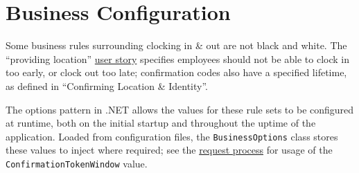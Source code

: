 \section{Business Configuration}

Some business rules surrounding clocking in \& out are not
black and white. The \enquote{providing location}
\hyperref[ss:stories]{user story} specifies employees should
not be able to clock in too early, or clock out too late;
confirmation codes also have a specified lifetime, as
defined in \enquote{Confirming Location \& Identity}. 

The options pattern in .NET allows the values for these rule
sets to be configured at runtime, both on the initial
startup and throughout the uptime of the application. Loaded
from configuration files, the \lstinline{BusinessOptions}
class stores these values to inject where required; see
the \hyperref[requestProcess]{request process} for usage of
the \lstinline{ConfirmationTokenWindow} value.